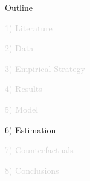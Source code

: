 \documentclass[aspectratio=169]{beamer}
\begin{document}
\begin{frame}[noframenumbering]{Outline}

\Large

\textcolor{lightgray}{1) Literature}

\vspace{3mm}

\textcolor{lightgray}{2) Data}

\vspace{3mm}

\textcolor{lightgray}{3) Empirical Strategy}

\vspace{3mm}

\textcolor{lightgray}{4) Results}

\vspace{3mm}

\textcolor{lightgray}{5) Model}

\vspace{3mm}

6) Estimation

\vspace{3mm}

\textcolor{lightgray}{7) Counterfactuals}

\vspace{3mm}

\textcolor{lightgray}{8) Conclusions}


\end{frame}

\end{document}
